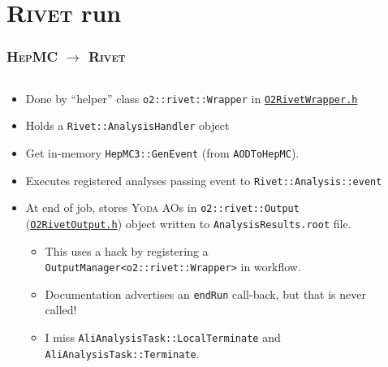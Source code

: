 \documentclass[compress,table,8pt]{beamer}
\newcommand\Rivet{{\scshape Rivet}}
\newcommand\Yoda{{\scshape Yoda}}
\newcommand\HepMC{{\scshape HepMC}}
\begin{document}
\section{\Rivet{} run}
\begin{frame}
  \frametitle{\HepMC{} $\rightarrow$ \Rivet{}}

  \begin{columns}[onlytextwidth]
    \begin{column}{.6\linewidth}
      \begin{itemize}
      \item<+-> Done by ``helper'' class \texttt{o2::rivet::Wrapper}
        in
        \href{https://gitlab.com/cholmcc/O2Rivet/-/blob/master/O2RivetWrapper.h}{\texttt{O2RivetWrapper.h}}
      \item<+-> Holds a \texttt{Rivet::AnalysisHandler} object
      \item<+-> Get in-memory \texttt{HepMC3::GenEvent} (from
        \texttt{AODToHepMC}).
      \item<+-> Executes registered analyses passing event to
        \texttt{Rivet::Analysis::event}
      \item<+-> At end of job, stores \Yoda{} AOs in
        \texttt{o2::rivet::Output}
        (\href{https://gitlab.com/cholmcc/O2Rivet/-/blob/master/O2RivetOutput.h}{\texttt{O2RivetOutput.h}})
        object written to \texttt{AnalysisResults.root} file.
        \begin{itemize}
        \item<+-> This uses a hack by registering a
          \texttt{OutputManager<o2::rivet::Wrapper>} in workflow.
        \item<+-> Documentation advertises an \texttt{endRun} call-back,
          but that is never called!
        \item<+-> I miss \texttt{AliAnalysisTask::LocalTerminate} and
          \texttt{AliAnalysisTask::Terminate}.
        \end{itemize}
      \end{itemize}
    \end{column}
    \begin{column}{.35\linewidth}
      \begin{center}
\end{center}
\end{column}
\end{columns}
\end{frame}
\end{document}
